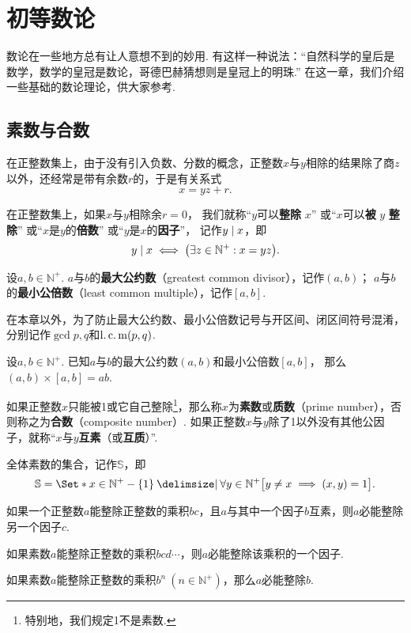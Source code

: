 \begingroup
\chapter{初等数论}
数论在一些地方总有让人意想不到的妙用.
有这样一种说法：“自然科学的皇后是数学，数学的皇冠是数论，哥德巴赫猜想则是皇冠上的明珠.”
在这一章，我们介绍一些基础的数论理论，供大家参考.

\section{素数与合数}
在正整数集上，由于没有引入负数、分数的概念，正整数\(x\)与\(y\)相除的结果除了商\(z\)以外，还经常是带有余数\(r\)的，于是有关系式\[
x = y z + r.
\]
\begin{definition}
在正整数集上，如果\(x\)与\(y\)相除余\(r=0\)，%
我们就称“\(y\)可以\textbf{整除} \(x\)”%
或“\(x\)可以\textbf{被} \(y\) \textbf{整除}”%
或“\(x\)是\(y\)的\textbf{倍数}”%
或“\(y\)是\(x\)的\textbf{因子}”，%
记作\(\truediv{x}{y}\)，即\[
\truediv{x}{y} \iff
\bigl( \exists z \in \mathbb{N}^+ : x = y z \bigr).
\]
\end{definition}

\begin{definition}
设\(a,b\in\mathbb{N}^+\).
\(a\)与\(b\)的\textbf{最大公约数}（greatest common divisor），记作\((a,b)\)；
\(a\)与\(b\)的\textbf{最小公倍数}（least common multiple），记作\([a,b]\).
\end{definition}
在本章以外，为了防止最大公约数、最小公倍数记号与开区间、闭区间符号混淆，分别记作\(\gcd{p,q}\)和\(\lcm{p,q}\).

\begin{theorem}
设\(a,b\in\mathbb{N}^+\).
已知\(a\)与\(b\)的最大公约数\((a,b)\)和最小公倍数\([a,b]\)，%
那么\((a,b)\times[a,b]=ab\).
\end{theorem}

\begin{definition}
如果正整数\(x\)只能被1或它自己整除\footnote{特别地，我们规定1不是素数.}，那么称\(x\)为\textbf{素数}或\textbf{质数}（prime number），否则称之为\textbf{合数}（composite number）.
如果正整数\(x\)与\(y\)除了1以外没有其他公因子，就称“\(x\)与\(y\)\textbf{互素}（或\textbf{互质}）”.

全体素数的集合，记作\(\mathbb{S}\)，即\[
\mathbb{S} = \Set*{
x\in\mathbb{N}^+-\{1\} \given \forall y\in\mathbb{N}^+ \bigl[
	y \neq x \implies (x,y)=1
\bigr]
}.
\]
\end{definition}

\begin{theorem}
如果一个正整数\(a\)能整除正整数的乘积\(bc\)，且\(a\)与其中一个因子\(b\)互素，则\(a\)必能整除另一个因子\(c\).
\end{theorem}
\begin{corollary}
如果素数\(a\)能整除正整数的乘积\(bcd\dotsm\)，则\(a\)必能整除该乘积的一个因子.
\end{corollary}
\begin{corollary}
如果素数\(a\)能整除正整数的乘积\(b^n\ (n\in\mathbb{N}^+)\)，那么\(a\)必能整除\(b\).
\end{corollary}

